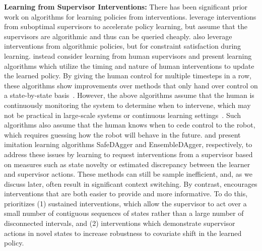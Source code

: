 \textbf{Learning from Supervisor Interventions: } There has been significant prior work on algorithms for learning policies from interventions. \citet{training_wheels, ac-teach} leverage interventions from suboptimal supervisors to accelerate policy learning, but assume that the supervisors are algorithmic and thus can be queried cheaply. \citet{recovery-rl, advantage_interventions, trial_no_error} also leverage interventions from algorithmic policies, but for constraint satisfaction during learning. \citet{hg_dagger, EIL, IARL, LAND, HITL, teaching-strats} instead consider learning from human supervisors and present learning algorithms which utilize the timing and nature of human interventions to update the learned policy. By giving the human control for multiple timesteps in a row, these algorithms show improvements over methods that only hand over control on a state-by-state basis~\cite{perf-eval-IL}. However, the above algorithms assume that the human is continuously monitoring the system to determine when to intervene, which may not be practical in large-scale systems or continuous learning settings~\cite{crandall2005validating,chen2014human,swamy2020scaled,kessler2019active}. Such algorithms also assume that the human knows when to cede control to the robot, which requires guessing how the robot will behave in the future. \citet{safe_dagger} and \citet{ensemble_dagger} present imitation learning algorithms SafeDAgger and EnsembleDAgger, respectively, to address these issues by learning to request interventions from a supervisor based on measures such as state novelty or estimated discrepancy between the learner and supervisor actions. These methods can still be sample inefficient, and, as we discuss later, often result in significant context switching.
By contrast, \algabbr encourages interventions that are both easier to provide and more informative. To do this, \algname prioritizes (1) sustained interventions, which allow the supervisor to act over a small number of contiguous sequences of states rather than a large number of disconnected intervals, and (2) interventions which demonstrate supervisor actions in novel states to increase robustness to covariate shift in the learned policy.